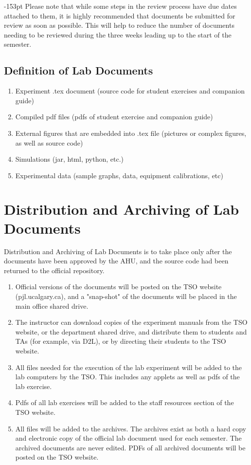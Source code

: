 \begin{adjustwidth}{}{-153pt}
Please note that while some steps in the review process have due dates attached to them, it is highly recommended that documents be submitted for review as soon as possible. This will help to reduce the number of documents needing to be reviewed during the three weeks leading up to the start of the semester.

\subsection{\bf Definition of Lab Documents}
\begin{enumerate}[noitemsep]
\item Experiment .tex document (source code for student exercises and companion guide)
\item Compiled pdf files (pdfs of student exercise and companion guide)
\item External figures that are embedded into .tex file (pictures or complex figures, as well as source code)
\item Simulations (jar, html, python, etc.)
\item Experimental data (sample graphs, data, equipment calibrations, etc) 
\end{enumerate}

\newpage
\section{\bf Distribution and Archiving  of Lab Documents}
\noindent Distribution and Archiving of Lab Documents is to take place only after the documents have been approved by the AHU, and the source code had been returned to the official repository.

\begin{enumerate}[noitemsep]
\item Official versions of the documents will be posted on the TSO website (pjl.ucalgary.ca), and a "snap-shot" of the documents will be placed in the main office shared drive.
\item The instructor can download copies of the experiment manuals from the TSO website, or the department shared drive, and distribute them to students and TAs (for example, via D2L), or by directing their students to the TSO website.
\item All files needed for the execution of the lab experiment will be added to the lab computers by the TSO. This includes any applets as well as pdfs of the lab exercise.
\item Pdfs of all lab exercises will be added to the staff resources section of the TSO website.
\item All files will be added to the archives. The archives exist as both a hard copy and electronic copy of the official lab document used for each semester. The archived documents are never edited. PDFs of all archived documents will be posted on the TSO website.  
\end{enumerate}
\vspace {2cm}


\end{adjustwidth}

